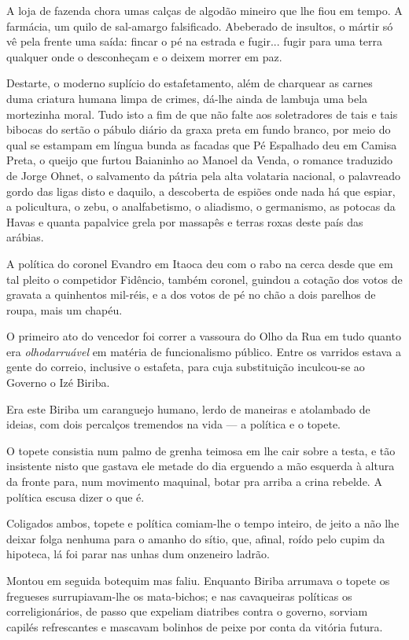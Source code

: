 A loja de fazenda chora umas calças de algodão mineiro que lhe fiou em
tempo. A farmácia, um quilo de sal-amargo falsificado. Abeberado de
insultos, o mártir só vê pela frente uma saída: fincar o pé na estrada e
fugir... fugir para uma terra qualquer onde o desconheçam e o deixem
morrer em paz.

Destarte, o moderno suplício do estafetamento, além de charquear as
carnes duma criatura humana limpa de crimes, dá-lhe ainda de lambuja uma
bela mortezinha moral. Tudo isto a fim de que não falte aos soletradores
de tais e tais bibocas do sertão o pábulo diário da graxa preta em fundo
branco, por meio do qual se estampam em língua bunda as facadas que Pé
Espalhado deu em Camisa Preta, o queijo que furtou Baianinho ao Manoel
da Venda, o romance traduzido de Jorge Ohnet, o salvamento da pátria
pela alta volataria nacional, o palavreado gordo das ligas disto e
daquilo, a descoberta de espiões onde nada há que espiar, a policultura,
o zebu, o analfabetismo, o aliadismo, o germanismo, as potocas da Havas
e quanta papalvice grela por massapês e terras roxas deste país das
arábias.

A política do coronel Evandro em Itaoca deu com o rabo na cerca desde
que em tal pleito o competidor Fidêncio, também coronel, guindou a
cotação dos votos de gravata a quinhentos mil-réis, e a dos votos de pé
no chão a dois parelhos de roupa, mais um chapéu.

O primeiro ato do vencedor foi correr a vassoura do Olho da Rua em tudo
quanto era \emph{olhodarruável} em matéria de funcionalismo público.
Entre os varridos estava a gente do correio, inclusive o estafeta, para
cuja substituição inculcou-se ao Governo o Izé Biriba.

Era este Biriba um caranguejo humano, lerdo de maneiras e atolambado de
ideias, com dois percalços tremendos na vida --- a política e o topete.

O topete consistia num palmo de grenha teimosa em lhe cair sobre a
testa, e tão insistente nisto que gastava ele metade do dia erguendo a
mão esquerda à altura da fronte para, num movimento maquinal, botar pra
arriba a crina rebelde. A política escusa dizer o que é.

Coligados ambos, topete e política comiam-lhe o tempo inteiro, de jeito
a não lhe deixar folga nenhuma para o amanho do sítio, que, afinal,
roído pelo cupim da hipoteca, lá foi parar nas unhas dum onzeneiro
ladrão.

Montou em seguida botequim mas faliu. Enquanto Biriba arrumava o topete
os fregueses surrupiavam-lhe os mata-bichos; e nas cavaqueiras políticas
os correligionários, de passo que expeliam diatribes contra o governo,
sorviam capilés refrescantes e mascavam bolinhos de peixe por conta da
vitória futura.


